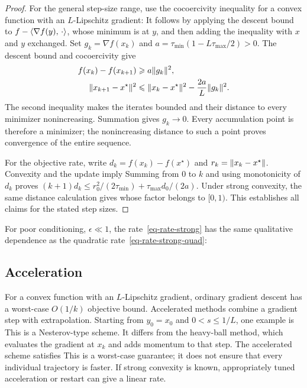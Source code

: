 \begin{proof}
For the general step-size range, use the cocoercivity inequality for a convex function with an $L$-Lipschitz gradient:
It follows by applying the descent bound to $f-\langle \nabla f(y),\,\cdot\rangle$, whose minimum is at $y$, and then adding the inequality with $x$ and $y$ exchanged. Set $g_k=\nabla f(x_k)$ and $a=\tau_{\min}(1-L\tau_{\max}/2)>0$. The descent bound and cocoercivity give
\begin{align*}
f(x_k)-f(x_{k+1})&\geqslant a\lVert g_k\rVert^2,\\
\lVert x_{k+1}-x^\star\rVert^2&\leqslant\lVert x_k-x^\star\rVert^2-\frac{2a}{L}\lVert g_k\rVert^2.
\end{align*}
The second inequality makes the iterates bounded and their distance to every minimizer nonincreasing. Summation gives $g_k\to0$. Every accumulation point is therefore a minimizer; the nonincreasing distance to such a point proves convergence of the entire sequence.

For the objective rate, write $d_k=f(x_k)-f(x^\star)$ and $r_k=\lVert x_k-x^\star\rVert$. Convexity and the update imply
Summing from $0$ to $k$ and using monotonicity of $d_k$ proves
$(k+1)d_k\leq r_0^2/(2\tau_{\min})+\tau_{\max}d_0/(2a)$.
Under strong convexity, the same distance calculation gives
whose factor belongs to $[0,1)$. This establishes all claims for the stated step sizes.
\end{proof}

For poor conditioning, $\epsilon \ll 1$, the rate~\eqref{eq-rate-strong} has the same qualitative dependence as the quadratic rate~\eqref{eq-rate-strong-quad}:


\subsection{Acceleration}

For a convex function with an $L$-Lipschitz gradient, ordinary gradient descent has a worst-case $O(1/k)$ objective bound. Accelerated methods combine a gradient step with extrapolation. Starting from $y_0=x_0$ and $0<s\leq1/L$, one example is
This is a Nesterov-type scheme. It differs from the heavy-ball method, which evaluates the gradient at $x_k$ and adds momentum to that step. The accelerated scheme satisfies
This is a worst-case guarantee; it does not ensure that every individual trajectory is faster. If strong convexity is known, appropriately tuned acceleration or restart can give a linear rate.

